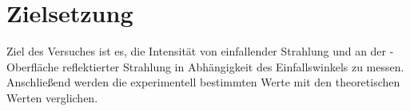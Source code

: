 \section{Zielsetzung}
\label{sec:zielsetzung}

Ziel des Versuches ist es, die Intensität von einfallender Strahlung und an der -Oberfläche reflektierter Strahlung 
in Abhängigkeit des Einfallswinkels zu messen. Anschließend werden die experimentell bestimmten Werte mit den theoretischen Werten 
verglichen.
